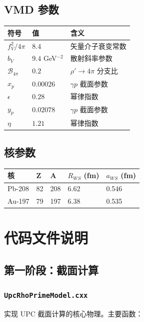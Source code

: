 \documentclass[11pt,a4paper,UTF8]{ctexart}
\begin{document}
\subsection{VMD 参数}

\begin{longtable}{l l l}
\toprule
\textbf{符号} & \textbf{值} & \textbf{含义} \\
\midrule
$f_V^2/4\pi$ & $8.4$ & 矢量介子衰变常数 \\
$b_V$ & $9.4$ GeV$^{-2}$ & 散射斜率参数 \\
$\mathcal{B}_{4\pi}$ & $0.2$ & $\rho' \to 4\pi$ 分支比 \\
$x_p$ & $0.00026$ & $\gamma p$ 截面参数 \\
$\epsilon$ & $0.28$ & 幂律指数 \\
$y_p$ & $0.02078$ & $\gamma p$ 截面参数 \\
$\eta$ & $1.21$ & 幂律指数 \\
\bottomrule
\end{longtable}

\subsection{核参数}

\begin{longtable}{l l l l l}
\toprule
\textbf{核} & \textbf{Z} & \textbf{A} & \textbf{$R_{WS}$ (fm)} & \textbf{$a_{WS}$ (fm)} \\
\midrule
Pb-208 & 82 & 208 & 6.62 & 0.546 \\
Au-197 & 79 & 197 & 6.38 & 0.535 \\
\bottomrule
\end{longtable}

\section{代码文件说明}

\subsection{第一阶段：截面计算}

\subsubsection{\texttt{UpcRhoPrimeModel.cxx}}

实现 UPC 截面计算的核心物理。主要函数：
\end{document}
